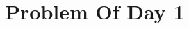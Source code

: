 \documentclass{article}
\newcommand{\YearPath}{../../../LatexConfig} %
\newcommand{\SemesterPath}{../../LatexConfig} %
\newcommand{\ClassPath}{../LatexConfig} %
\begin{document}




\section{Problem Of Day 1}

\end{document}
